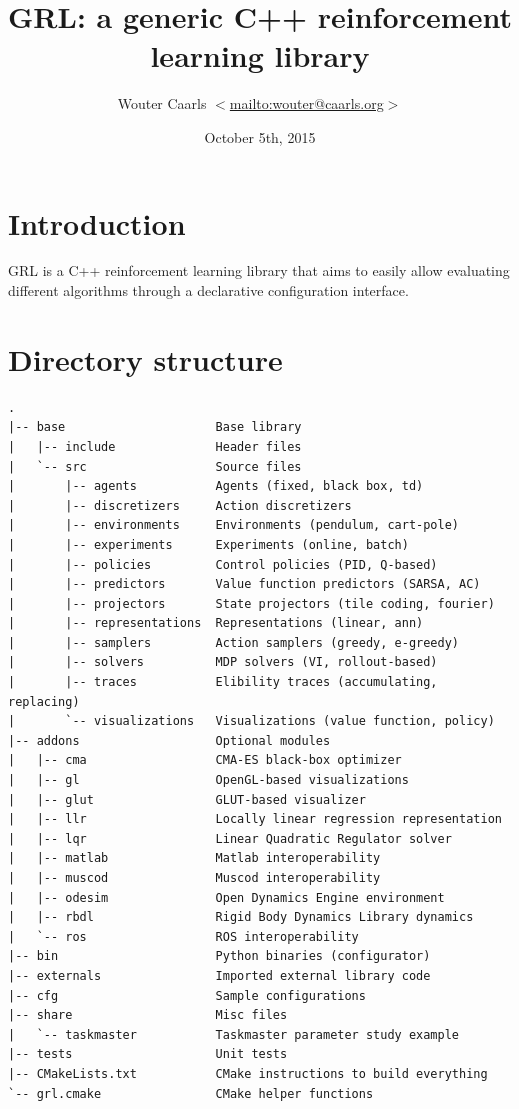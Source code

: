 \documentclass{article}
\title{GRL: a generic C++ reinforcement learning library}
\author{Wouter Caarls $<$\url{mailto:wouter@caarls.org}$>$}
\date{October 5th, 2015}
\begin{document}
\maketitle

\section{Introduction}

GRL is a C++ reinforcement learning library that aims to easily allow
evaluating different algorithms through a declarative configuration
interface.

\section{Directory structure}

\begin{verbatim}
.
|-- base                     Base library
|   |-- include              Header files
|   `-- src                  Source files
|       |-- agents           Agents (fixed, black box, td)
|       |-- discretizers     Action discretizers
|       |-- environments     Environments (pendulum, cart-pole)
|       |-- experiments      Experiments (online, batch)
|       |-- policies         Control policies (PID, Q-based)
|       |-- predictors       Value function predictors (SARSA, AC)
|       |-- projectors       State projectors (tile coding, fourier)
|       |-- representations  Representations (linear, ann) 
|       |-- samplers         Action samplers (greedy, e-greedy)
|       |-- solvers          MDP solvers (VI, rollout-based)
|       |-- traces           Elibility traces (accumulating, replacing)
|       `-- visualizations   Visualizations (value function, policy)
|-- addons                   Optional modules
|   |-- cma                  CMA-ES black-box optimizer
|   |-- gl                   OpenGL-based visualizations
|   |-- glut                 GLUT-based visualizer
|   |-- llr                  Locally linear regression representation
|   |-- lqr                  Linear Quadratic Regulator solver
|   |-- matlab               Matlab interoperability
|   |-- muscod               Muscod interoperability
|   |-- odesim               Open Dynamics Engine environment
|   |-- rbdl                 Rigid Body Dynamics Library dynamics
|   `-- ros                  ROS interoperability
|-- bin                      Python binaries (configurator)
|-- externals                Imported external library code
|-- cfg                      Sample configurations
|-- share                    Misc files
|   `-- taskmaster           Taskmaster parameter study example
|-- tests                    Unit tests
|-- CMakeLists.txt           CMake instructions to build everything
`-- grl.cmake                CMake helper functions
\end{verbatim}
\end{document}
